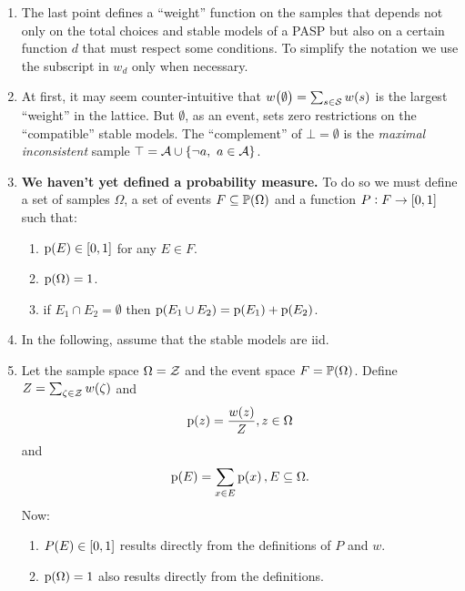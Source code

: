 \documentclass{beamer}
\newcommand{\at}[1]{\ensuremath{\!\del{#1}}}
\newcommand{\fml}[1]{\ensuremath{{\cal #1}}}
\newcommand{\pset}[1]{\ensuremath{\mathbb{P}\at{#1}}}
\newcommand{\cset}[2]{\ensuremath{\set{#1,~#2}}}
\newcommand{\pr}[1]{\ensuremath{\mathrm{p}\at{#1}}}
\begin{document}
    \begin{frame}
        \begin{enumerate}
        \item The last point defines a ``weight'' function on the samples that depends not only on the total choices and stable models of a PASP but also on a certain function $d$ that must respect some conditions. To simplify the notation we use the subscript in $w_d$ only when necessary.
        \item At first, it may seem counter-intuitive that $w\at{\emptyset} = \sum_{s\in\fml{S}} w\at{s}$ is the largest ``weight'' in the lattice. But $\emptyset$, as an event, sets zero restrictions on the ``compatible'' stable models. The ``complement'' of $\bot = \emptyset$ is the \emph{maximal inconsistent} sample $\top = \fml{A} \cup \cset{\neg a }{ a \in \fml{A}}$.
        \item \textbf{We haven't yet defined a probability measure.} To do so we must define a set of samples $\Omega$, a set of events $F\subseteq \pset{\Omega}$ and a function $P:F\to\intcc{0,1}$ such that:
        \begin{enumerate}
            \item $\pr{E} \in \intcc{0, 1}$ for any $E \in F$.
            \item $\pr{\Omega} = 1$.
            \item if $E_1 \cap E_2 = \emptyset$ then $\pr{E_1 \cup E_2} = \pr{E_1} + \pr{E_2}$. 
        \end{enumerate} 
        \item In the following, assume that the stable models are iid.
        \item Let the sample space $\Omega = \fml{Z}$ and the event space $F = \pset{\Omega}$. Define $Z = \sum_{\zeta\in\fml{Z}} w\at{\zeta}$ and
        \begin{equation}
            \pr{z} = \frac{w\at{z}}{Z}, z \in \Omega \label{eq:def.prob}
        \end{equation}
        and
        \begin{equation}
            \pr{E} = \sum_{x\in E} \pr{x}, E \subseteq \Omega. \label{eq:def.prob.event}
        \end{equation}
        Now:
        \begin{enumerate}
            \item $P(E) \in \intcc{0,1}$ results directly from the definitions of $P$ and $w$.
            \item $\pr{\Omega} = 1$ also results directly from the definitions.

\end{enumerate}
\end{enumerate}
\end{frame}
\end{document}
